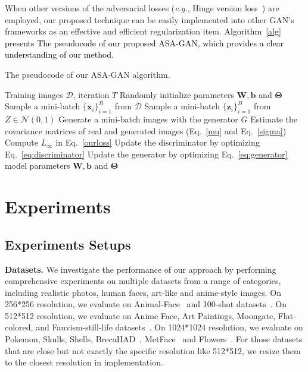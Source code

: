 \documentclass[10pt,journal,compsoc]{IEEEtran}
\newcommand{\revise}[1]{\textcolor{black}{#1}}
\begin{document}
When other versions of the adversarial losses (\emph{e.g.}, Hinge version loss~\cite{lim2017geometric}) are employed, our proposed technique can be easily implemented into other GAN's frameworks as an effective and efficient regularization item.
%
\revise{Algorithm~\ref{alg} presents The pseudocode of our proposed ASA-GAN, which provides a clear understanding of our method}.
\begin{center}
    \vskip -0.1in
        \begin{algorithm}[H]
            \caption{The pseudocode of our ASA-GAN algorithm.}
            \label{alg}
        \begin{algorithmic}[1]
             Training images $\mathcal{D}$, iteration $T$
            \STATE Randomly initialize parameters $\bm{W}, \bm{b}$ and $\bm{\Theta}$
            \STATE Sample a mini-batch $\{ \bm{x}_i \}_{i=1}^B$  from $\mathcal{D}$
            \STATE Sample a mini-batch $\{ \bm{z}_i \}_{i=1}^B$ from $Z \in \mathcal{N}(0,1)$
            \STATE Generate a mini-batch images with the generator $G$
            \STATE Estimate the covariance matrices of real and generated images (Eq.~\ref{mu} and Eq.~\ref{sigma})
            \STATE Compute $\overline L _\infty$ in Eq.~\ref{ourloss}
            \STATE Update the discriminator by optimizing Eq.~\ref{eq:discriminator}
            \STATE Update the generator by optimizing Eq.~\ref{eq:generator}
            \ENDFOR
             model parameters $\bm{W}, \bm{b}$ and $\bm{\Theta}$
        \end{algorithmic}
        \end{algorithm}
\end{center}



\section{Experiments}
\subsection{Experiments Setups}
\textbf{Datasets.}
We investigate the performance of our approach by performing comprehensive experiments on multiple datasets from a range of categories, including realistic photos, human faces, art-like and anime-style images.
On 256*256 resolution, we evaluate on Animal-Face~\cite{si2011learning} and 100-shot datasets~\cite{DiffAug}.
On 512*512 resolution, we evaluate on Anime Face, Art Paintings, Moongate, Flat-colored, and Fauvism-still-life datasets~\cite{liu2021towards}.
On 1024*1024 resolution, we evaluate on Pokemon, Skulls, Shells, BrecaHAD~\cite{aksac2019brecahad}, MetFace~\cite{karras2020training} and Flowers~\cite{nilsback2006visual}.
For those datasets that are close but not exactly the specific resolution like 512*512, we resize them to the closest resolution in implementation.
\end{document}
